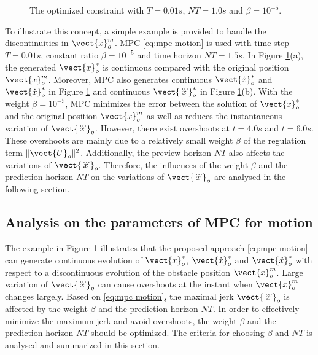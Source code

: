 \begin{figure}[!htb]
\centering
{} \quad
{} \quad
{}\quad
\caption{The optimized constraint with $T=0.01s$, $NT=1.0s$ and $\beta=10^{-5}$.}
\label{fig:MPC constant ratio}
\end{figure}


To illustrate this concept, a simple example is provided to handle the discontinuities in $\vect{x}^{m}_{o}$. MPC \eqref{eq:mpc motion} is used with time step $T = 0.01s$, constant ratio $\beta=10^{-5}$ and time horizon $NT=1.5s$. In Figure \ref{fig:MPC constant ratio}(a), the generated $\vect{x}_{o}^*$ is continuous compared with the original position $\vect{x}^{m}_{o}$. Moreover, MPC also generates continuous $\vect{\dot{x}}_o^*$ and $\vect{\dot{x}}_o^*$ in Figure \ref{fig:MPC constant ratio} and continuous $\vect{\dddot{x}}_{o}^*$ in Figure \ref{fig:MPC constant ratio}(b). With the weight $\beta=10^{-5}$, MPC minimizes the error between the solution of $\vect{x}_o^*$ and the original position $\vect{x}_o^m$ as well as reduces the instantaneous variation of $\vect{\dddot{x}}_{o}$. However, there exist overshoots at $t=4.0s$ and $t=6.0s$. These overshoots are mainly due to a relatively small weight $\beta$ of the regulation term $\|\vect{U}_o \|^2$. Additionally, the preview horizon $NT$ also affects the variations of $\vect{\dddot{x}}_o$. Therefore, the influences of the weight $\beta$ and the prediction horizon $NT$ on the variations of $\vect{\dddot{x}}_o$ are analysed in the following section. 


\subsection{Analysis on the parameters of MPC for motion}
The example in Figure \ref{fig:MPC constant ratio} illustrates that the proposed approach \eqref{eq:mpc motion} can generate continuous evolution of $\vect{x}_o^*$, $\vect{\dot{x}}_o^*$ and $\vect{\ddot{x}}_o^*$ with respect to a discontinuous evolution of the obstacle position $\vect{x}^{m}_{o}$. Large variation of $\vect{\dddot{x}}_o$ can cause overshoots at the instant when $\vect{x}_o^m$ changes largely. Based on \eqref{eq:mpc motion}, the maximal jerk $\vect{\dddot{x}}_o$ is affected by the weight $\beta$ and the prediction horizon $NT$. In order to effectively minimize the maximum jerk and avoid overshoots, the weight $\beta$ and the prediction horizon $NT$ should be optimized. The criteria for choosing $\beta$ and $NT$ is analysed and summarized in this section.

